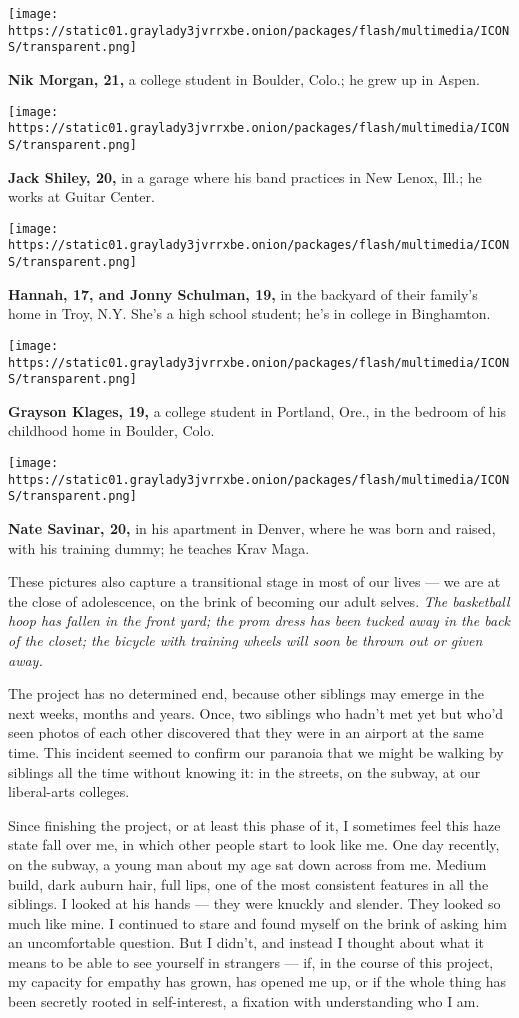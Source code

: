 \texttt{[image: https://static01.graylady3jvrrxbe.onion/packages/flash/multimedia/ICONS/transparent.png]}

\textbf{Nik Morgan, 21,} a college student in Boulder, Colo.; he grew up
in Aspen.

\texttt{[image: https://static01.graylady3jvrrxbe.onion/packages/flash/multimedia/ICONS/transparent.png]}

\textbf{Jack Shiley, 20,} in a garage where his band practices in New
Lenox, Ill.; he works at Guitar Center.

\texttt{[image: https://static01.graylady3jvrrxbe.onion/packages/flash/multimedia/ICONS/transparent.png]}

\textbf{Hannah, 17, and Jonny Schulman, 19,} in the backyard of their
family's home in Troy, N.Y. She's a high school student; he's in college
in Binghamton.

\texttt{[image: https://static01.graylady3jvrrxbe.onion/packages/flash/multimedia/ICONS/transparent.png]}

\textbf{Grayson Klages, 19,} a college student in Portland, Ore., in the
bedroom of his childhood home in Boulder, Colo.

\texttt{[image: https://static01.graylady3jvrrxbe.onion/packages/flash/multimedia/ICONS/transparent.png]}

\textbf{Nate Savinar, 20,} in his apartment in Denver, where he was born
and raised, with his training dummy; he teaches Krav Maga.

These pictures also capture a transitional stage in most of our lives
--- we are at the close of adolescence, on the brink of becoming our
adult selves. \emph{The basketball hoop has fallen in the front yard;
the prom dress has been tucked away in the back of the closet; the
bicycle with training wheels will soon be thrown out or given away.}

The project has no determined end, because other siblings may emerge in
the next weeks, months and years. Once, two siblings who hadn't met yet
but who'd seen photos of each other discovered that they were in an
airport at the same time. This incident seemed to confirm our paranoia
that we might be walking by siblings all the time without knowing it: in
the streets, on the subway, at our liberal-arts colleges.

Since finishing the project, or at least this phase of it, I sometimes
feel this haze state fall over me, in which other people start to look
like me. One day recently, on the subway, a young man about my age sat
down across from me. Medium build, dark auburn hair, full lips, one of
the most consistent features in all the siblings. I looked at his hands
--- they were knuckly and slender. They looked so much like mine. I
continued to stare and found myself on the brink of asking him an
uncomfortable question. But I didn't, and instead I thought about what
it means to be able to see yourself in strangers --- if, in the course
of this project, my capacity for empathy has grown, has opened me up, or
if the whole thing has been secretly rooted in self-interest, a fixation
with understanding who I am.

